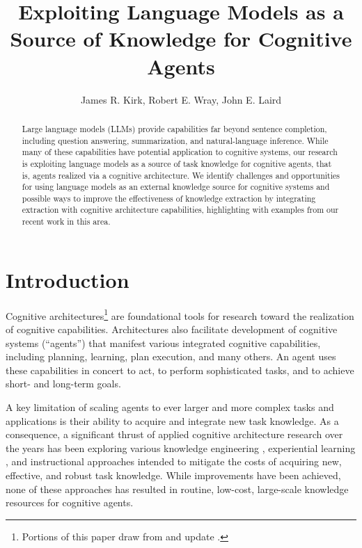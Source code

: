 \documentclass[letterpaper]{article} %
\title{Exploiting Language Models as a Source of Knowledge for Cognitive Agents}
\author{
James R. Kirk, Robert E. Wray, John E. Laird
}
\begin{document}
\maketitle

\begin{abstract}
Large language models (LLMs) provide capabilities far beyond sentence completion, including question answering, summarization, and natural-language inference. While many of these capabilities have potential application to cognitive systems, our research is exploiting language models as a source of task knowledge for cognitive agents, that is, agents realized via a cognitive architecture. We identify challenges and opportunities for using language models as an external knowledge source for cognitive systems and possible ways to improve the effectiveness of knowledge extraction by integrating extraction with cognitive architecture capabilities, highlighting with examples from our recent work in this area.
\end{abstract}




\section{Introduction}

Cognitive architectures\footnote{Portions of this paper draw from and update  \citet{wray_language_2021}.} \cite{anderson_integrated_2004,laird_soar_2012,kotseruba_40_2020,newell_unified_1990} are foundational tools  for research toward the realization of cognitive capabilities. Architectures also facilitate development of cognitive systems (``agents'') that manifest various integrated cognitive capabilities, including planning, learning, plan execution, and many others. An agent uses these capabilities in concert to act, to perform sophisticated tasks, and to achieve short- and long-term goals.

A key limitation of scaling agents to ever larger and more complex tasks and applications is their ability to acquire and integrate new task knowledge. As a consequence, a significant thrust of applied cognitive architecture research over the years has been exploring various knowledge engineering  \cite{yost_acquiring_1993,crossman_high_2004,ritter_high-level_2006}, experiential learning \cite{nejati_learning_2006,choi_evolution_2018,pearson_toward_1998}, and instructional \cite{huffman_flexibly_1995,gluck_interactive_2019} approaches intended to mitigate the costs of acquiring new, effective, and robust task knowledge. While improvements have been achieved, none of these approaches has resulted in routine, low-cost, large-scale knowledge resources for cognitive agents.
\end{document}
